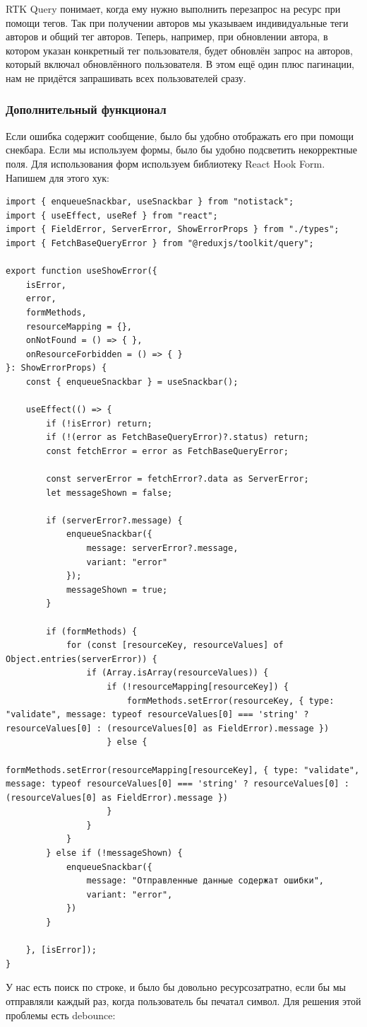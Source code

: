 \documentclass[a4paper,14pt]{extarticle}
\begin{document}
RTK Query понимает, когда ему нужно выполнить перезапрос на ресурс при помощи тегов. 
Так при получении авторов мы указываем индивидуальные теги авторов и общий тег авторов.
Теперь, например, при обновлении автора, в котором указан конкретный тег пользователя, 
будет обновлён запрос на авторов, который включал обновлённого пользователя. В этом ещё один
плюс пагинации, нам не придётся запрашивать всех пользователей сразу.

\subsubsection{Дополнительный функционал}
Если ошибка содержит сообщение, было бы удобно отображать его при помощи снекбара. 
Если мы используем формы, было бы удобно подсветить некорректные поля. Для 
использования форм используем библиотеку React Hook Form. Напишем для этого хук:
\begin{verbatim}
import { enqueueSnackbar, useSnackbar } from "notistack";
import { useEffect, useRef } from "react";
import { FieldError, ServerError, ShowErrorProps } from "./types";
import { FetchBaseQueryError } from "@reduxjs/toolkit/query";

export function useShowError({
    isError,
    error,
    formMethods,
    resourceMapping = {},
    onNotFound = () => { },
    onResourceForbidden = () => { }
}: ShowErrorProps) {
    const { enqueueSnackbar } = useSnackbar();

    useEffect(() => {
        if (!isError) return;
        if (!(error as FetchBaseQueryError)?.status) return;
        const fetchError = error as FetchBaseQueryError;

        const serverError = fetchError?.data as ServerError;
        let messageShown = false;

        if (serverError?.message) {
            enqueueSnackbar({
                message: serverError?.message,
                variant: "error"
            });
            messageShown = true;
        }

        if (formMethods) {
            for (const [resourceKey, resourceValues] of Object.entries(serverError)) {
                if (Array.isArray(resourceValues)) {
                    if (!resourceMapping[resourceKey]) {
                        formMethods.setError(resourceKey, { type: "validate", message: typeof resourceValues[0] === 'string' ? resourceValues[0] : (resourceValues[0] as FieldError).message })
                    } else {
                        formMethods.setError(resourceMapping[resourceKey], { type: "validate", message: typeof resourceValues[0] === 'string' ? resourceValues[0] : (resourceValues[0] as FieldError).message })
                    }
                }
            }
        } else if (!messageShown) {
            enqueueSnackbar({
                message: "Отправленные данные содержат ошибки",
                variant: "error",
            })
        }

    }, [isError]);
}
\end{verbatim}
У нас есть поиск по строке, и было бы довольно ресурсозатратно, если бы мы отправляли 
каждый раз, когда пользователь бы печатал символ. Для решения этой проблемы есть debounce:
\end{document}
